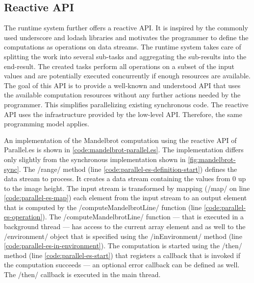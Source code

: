 \subsection{Reactive API}
The runtime system further offers a reactive API. It is inspired by the commonly used underscore and lodash libraries and motivates the programmer to define the computations as operations on data streams. The runtime system takes care of splitting the work into several sub-tasks and aggregating the sub-results into the end-result. The created tasks perform all operations on a subset of the input values and are potentially executed concurrently if enough resources are available. The goal of this API is to provide a well-known and understood API that uses the available computation resources without any further actions needed by the programmer. This simplifies parallelizing existing synchronous code. The reactive API uses the infrastructure provided by the low-level API. Therefore, the same programming model applies.


 An implementation of the Mandelbrot computation using the reactive API of Parallel.es is shown in \cref{code:mandelbrot-parallel.es}. The implementation differs only slightly from the synchronous implementation shown in \cref{fig:mandelbrot-sync}. The \javascriptinline/range/ method (line \ref{code:parallel-es-definition-start}) defines the data stream to process. It creates a data stream containing the values from 0 up to the image height. The input stream is transformed by mapping (\javascriptinline/map/ on line \ref{code:parallel-es-map}) each element from the input stream to an output element that is computed by the \javascriptinline/computeMandelbrotLine/ function (line \ref{code:parallel-es-operation}). The \javascriptinline/computeMandelbrotLine/ function --- that is executed in a background thread --- has access to the current array element and as well to the \javascriptinline/environment/ object that is specified using the \javascriptinline/inEnvironment/ method (line \ref{code:parallel-es-in-environment}). The computation is started using the \javascriptinline/then/ method (line \ref{code:parallel-es-start}) that registers a callback that is invoked if the computation succeeds --- an optional error callback can be defined as well. The \javascriptinline/then/ callback is executed in the main thread.

